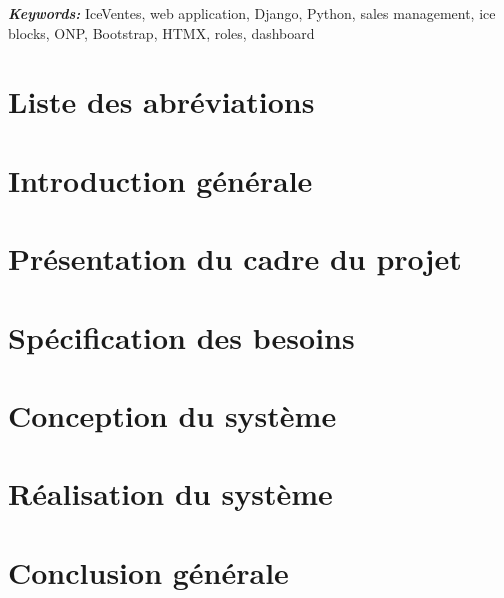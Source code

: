 \documentclass[a4paper,oneside,12pt]{report}
\providecommand{\enkeywords}[1]{\textbf{\textit{Keywords: }} #1}
\begin{document}
\vspace{0.6em}
\noindent\enkeywords{IceVentes, web application, Django, Python, sales management, ice blocks, ONP, Bootstrap, HTMX, roles, dashboard}

\clearpage
{}
{}
\tableofcontents
\setcounter{tocdepth}{2}
\clearpage
{}
{}
\listoffigures
\clearpage
{}
{}
\listoftables
\clearpage
{}
\chapter*{Liste des abréviations}


\clearpage
\pagestyle{fancy}

\chapter*{Introduction générale}


\chapter{Présentation du cadre du projet}


\chapter{Spécification des besoins}


\chapter{Conception du système}


\chapter{Réalisation du système}


\chapter*{Conclusion générale}


\clearpage
{}

\end{document}
